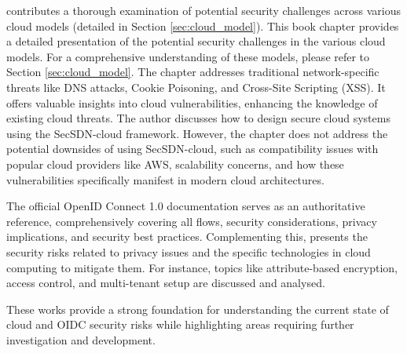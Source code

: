 \cite{Mishra2019-uh} contributes a thorough examination of potential security challenges across various cloud models (detailed in Section \ref{sec:cloud_model}). This book chapter provides a detailed presentation of the potential security challenges in the various cloud models. For a comprehensive understanding of these models, please refer to Section \ref{sec:cloud_model}. The chapter addresses traditional network-specific threats like DNS attacks, Cookie Poisoning, and Cross-Site Scripting (XSS). It offers valuable insights into cloud vulnerabilities, enhancing the knowledge of existing cloud threats. The author discusses how to design secure cloud systems using the SecSDN-cloud framework. However,  the chapter does not address the potential downsides of using SecSDN-cloud, such as compatibility issues with popular cloud providers like AWS, scalability concerns, and how these vulnerabilities specifically manifest in modern cloud architectures.

The official OpenID Connect 1.0 documentation \cite{openid_docs} serves as an authoritative reference, comprehensively covering all flows, security considerations, privacy implications, and security best practices. Complementing this, \cite{sec_privacy_cloud} presents the security risks related to privacy issues and the specific technologies in cloud computing to mitigate them. For instance, topics like attribute-based encryption, access control, and multi-tenant setup are discussed and analysed.

These works  provide a strong foundation for understanding the current state of cloud and OIDC security risks while highlighting areas requiring further investigation and development. 


